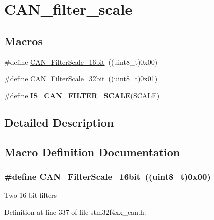 \hypertarget{group___c_a_n__filter__scale}{\section{C\-A\-N\-\_\-filter\-\_\-scale}
\label{group___c_a_n__filter__scale}
}
\subsection*{Macros}
\begin{DoxyCompactItemize}
\item 
\#define \hyperlink{group___c_a_n__filter__scale_ga9e0493937e73bcf9a4127eef2f255a95}{C\-A\-N\-\_\-\-Filter\-Scale\-\_\-16bit}~((uint8\-\_\-t)0x00)
\item 
\#define \hyperlink{group___c_a_n__filter__scale_gac63dfb0e11713c59268ee9f4aebab60e}{C\-A\-N\-\_\-\-Filter\-Scale\-\_\-32bit}~((uint8\-\_\-t)0x01)
\item 
\#define {\bfseries I\-S\-\_\-\-C\-A\-N\-\_\-\-F\-I\-L\-T\-E\-R\-\_\-\-S\-C\-A\-L\-E}(S\-C\-A\-L\-E)
\end{DoxyCompactItemize}


\subsection{Detailed Description}


\subsection{Macro Definition Documentation}
\hypertarget{group___c_a_n__filter__scale_ga9e0493937e73bcf9a4127eef2f255a95}{
\subsubsection[{C\-A\-N\-\_\-\-Filter\-Scale\-\_\-16bit}]{\setlength{\rightskip}{0pt plus 5cm}\#define C\-A\-N\-\_\-\-Filter\-Scale\-\_\-16bit~((uint8\-\_\-t)0x00)}}\label{group___c_a_n__filter__scale_ga9e0493937e73bcf9a4127eef2f255a95}
Two 16-\/bit filters 

Definition at line 337 of file stm32f4xx\-\_\-can.\-h.


